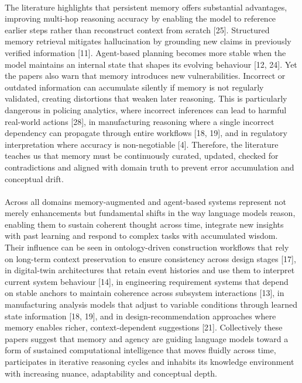        \paragraph{} 
        The literature highlights that persistent memory offers substantial advantages, improving multi-hop reasoning accuracy by enabling the model to reference earlier steps rather than reconstruct context from scratch [25]. Structured memory retrieval mitigates hallucination by grounding new claims in previously verified information [11]. Agent-based planning becomes more stable when the model maintains an internal state that shapes its evolving behaviour [12, 24]. Yet the papers also warn that memory introduces new vulnerabilities. Incorrect or outdated information can accumulate silently if memory is not regularly validated, creating distortions that weaken later reasoning. This is particularly dangerous in policing analytics, where incorrect inferences can lead to harmful real-world actions [28], in manufacturing reasoning where a single incorrect dependency can propagate through entire workflows [18, 19], and in regulatory interpretation where accuracy is non-negotiable [4]. Therefore, the literature teaches us that memory must be continuously curated, updated, checked for contradictions and aligned with domain truth to prevent error accumulation and conceptual drift.

        \paragraph{} 
        Across all domains memory-augmented and agent-based systems represent not merely enhancements but fundamental shifts in the way language models reason, enabling them to sustain coherent thought across time, integrate new insights with past learning and respond to complex tasks with accumulated wisdom. Their influence can be seen in ontology-driven construction workflows that rely on long-term context preservation to ensure consistency across design stages [17], in digital-twin architectures that retain event histories and use them to interpret current system behaviour [14], in engineering requirement systems that depend on stable anchors to maintain coherence across subsystem interactions [13], in manufacturing analysis models that adjust to variable conditions through learned state information [18, 19], and in design-recommendation approaches where memory enables richer, context-dependent suggestions [21]. Collectively these papers suggest that memory and agency are guiding language models toward a form of sustained computational intelligence that moves fluidly across time, participates in iterative reasoning cycles and inhabits its knowledge environment with increasing nuance, adaptability and conceptual depth.
        
